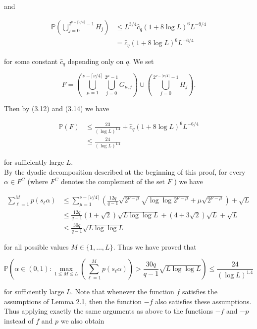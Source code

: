 \documentclass[10pt]{article}
\newcommand{\1}{\mathbf{1}}
\begin{document}
and


\begin{align*}
\mathbb{P}\left(\bigcup_{j=0}^{2^{\nu-\lceil\nu/4\rceil}-1} H_{j}\right) & \leqslant L^{3 / 4} \hat{c}_{q}(1+8 \log L)^{6} L^{-9 / 4} \\
& =\hat{c}_{q}(1+8 \log L)^{6} L^{-6 / 4} \tag{3.14}
\end{align*}


for some constant $\hat{c}_{q}$ depending only on $q$. We set

$$
F=\left(\bigcup_{\mu=1}^{\nu-\lceil\nu / 4\rceil} \bigcup_{j=0}^{2^{\mu}-1} G_{\mu, j}\right) \cup\left(\bigcup_{j=0}^{2^{\nu-\lceil\nu/4\rceil}-1} H_{j}\right) .
$$

Then by (3.12) and (3.14) we have


\begin{align*}
\mathbb{P}(F) & \leqslant \frac{23}{(\log L)^{1.4}}+\hat{c}_{q}(1+8 \log L)^{6} L^{-6 / 4}  \tag{3.15}\\
& \leqslant \frac{24}{(\log L)^{1.4}} \tag{3.16}
\end{align*}


for sufficiently large $L$.\\
By the dyadic decomposition described at the beginning of this proof, for every $\alpha \in F^{C}$ (where $F^{C}$ denotes the complement of the set $F$ ) we have

$$
\begin{aligned}
\sum_{\ell=1}^{M} p\left(s_{\ell} \alpha\right) & \leqslant \sum_{\mu=1}^{\nu-\lceil\nu / 4\rceil}\left(\frac{12q}{q-1} \sqrt{2^{\nu-\mu}} \sqrt{\log \log 2^{\nu-\mu}}+\mu \sqrt{2^{\nu-\mu}}\right)+\sqrt{L} \\
& \leqslant \frac{12q}{q-1}(1+\sqrt{2}) \sqrt{L \log \log L}+(4+3 \sqrt{2}) \sqrt{L}+\sqrt{L} \\
& \leqslant \frac{30q}{q-1} \sqrt{L \log \log L}
\end{aligned}
$$

for all possible values $M \in\{1, \ldots, L\}$. Thus we have proved that


\begin{equation*}
\mathbb{P}\left(\alpha \in(0,1): \max _{1 \leqslant M \leqslant L}\left(\sum_{\ell=1}^{M} p\left(s_{\ell} \alpha\right)\right)>\frac{30q}{q-1} \sqrt{L \log \log L}\right) \leqslant \frac{24}{(\log L)^{1.4}} \tag{3.17}
\end{equation*}


for sufficiently large $L$. Note that whenever the function $f$ satisfies the assumptions of Lemma 2.1, then the function $-f$ also satisfies these assumptions. Thus applying exactly the same arguments as above to the functions $-f$ and $-p$ instead of $f$ and $p$ we also obtain
\end{document}
